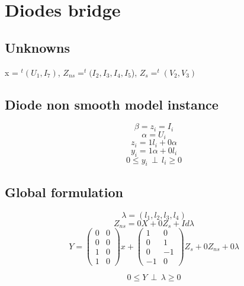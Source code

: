 \documentclass[10pt]{article}
\begin{document}
\section{Diodes bridge}

\begin{figure}[h]
\centerline{
 \scalebox{0.7}{
    
 }
}\end{figure}


\subsection{Unknowns}

x = $^{t}(U_{1},I_{7})$,
$Z_{ns}=^{t}(I_{2},I_{3},I_{4},I_{5}$),
$Z_{s} = ^{t}(V_{2},V_{3})$
\subsection{Diode non smooth model instance}

\[ \beta = z_{i} = I_{i}\]
\[ \alpha =U_{i}\]
\[z_{i}=1l_{i}+0\alpha\]
\[y_{i}=1\alpha+0l_{i}\]
\[0 \leq y_{i} \, \perp \, l_{i} \geq 0\]


\subsection{Global formulation}

\[ \lambda =(l_{1},l_{2},l_{3},l_{4})\]
\[Z_{ns}=0X+0Z_{s}+Id\lambda\]
\[Y=\left(\begin{array}{cc}
0&0\\
0&0\\
1&0\\
1&0\end{array}\right) x+
\left(\begin{array}{cc}
1&0\\
0&1\\
0&-1\\
-1&0\end{array}
\right) Z_{s} + 0Z_{ns} +0\lambda\]

\[0 \leq Y \, \perp \, \lambda \geq 0\]
\end{document}
